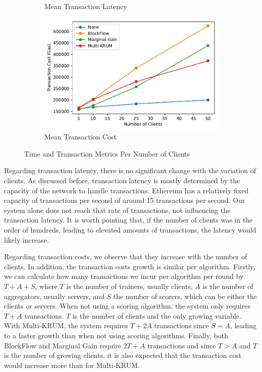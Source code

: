 \begin{figure}[!ht]
\begin{subfigure}[b]{0.49\textwidth}
        \caption{Mean Transaction Latency}
    \end{subfigure}
    \hfill
    \begin{subfigure}[b]{0.49\textwidth}
        \centering
        \includegraphics[width=\textwidth]{graphics/clients/tx_cost.pdf}
        \caption{Mean Transaction Cost}
    \end{subfigure}
    \caption{Time and Transaction Metrics Per Number of Clients}
    \label{fig:clients_metrics}
\end{figure}

Regarding transaction latency, there is no significant change with the variation of clients. As discussed before, transaction latency is mostly determined by the capacity of the network to handle transactions. Ethereum has a relatively fixed capacity of transactions per second of around 15 transactions per second. Our system alone does not reach that rate of transactions, not influencing the transaction latency. It is worth pointing that, if the number of clients was in the order of hundreds, leading to elevated amounts of transactions, the latency would likely increase.

Regarding transaction costs, we observe that they increase with the number of clients. In addition, the transaction costs growth is similar per algorithm. Firstly, we can calculate how many transactions we incur per algorithm per round by $T+A+S$, where $T$ is the number of trainers, usually clients, $A$ is the number of aggregators, usually servers, and $S$ the number of scorers, which can be either the clients or servers. When not using a scoring algorithm, the system only requires $T+A$ transactions. $T$ is the number of clients and the only growing variable. With Multi-KRUM, the system requires $T+2A$ transactions since $S=A$, leading to a faster growth than when not using scoring algorithms. Finally, both BlockFlow and Marginal Gain require $2T+A$ transactions and since $T > A$ and $T$ is the number of growing clients, it is also expected that the transaction cost would increase more than for Multi-KRUM.

